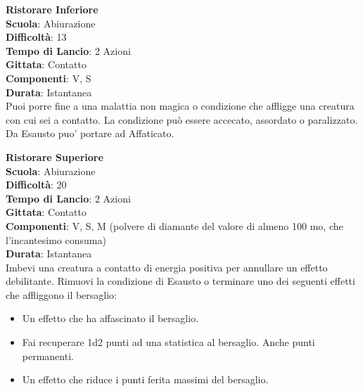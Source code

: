 \begin{multicols}{2}
\medskip\textbf{Ristorare Inferiore}\\
\textbf{Scuola}: Abiurazione\\
\textbf{Difficoltà}:  13\\
\textbf{Tempo di Lancio}: 2 Azioni\\
\textbf{Gittata}: Contatto\\
\textbf{Componenti}: V, S\\
\textbf{Durata}: Istantanea\\
Puoi porre fine a una malattia non magica o condizione che affligge una creatura con cui sei a contatto. La condizione può essere accecato, assordato o paralizzato. Da Esausto puo' portare ad Affaticato.

\medskip\textbf{Ristorare Superiore}\\
\textbf{Scuola}: Abiurazione\\
\textbf{Difficoltà}:  20\\
\textbf{Tempo di Lancio}: 2 Azioni\\
\textbf{Gittata}: Contatto\\
\textbf{Componenti}: V, S, M (polvere di diamante del valore di almeno 100 mo, che l'incantesimo consuma)\\
\textbf{Durata}: Istantanea\\
Imbevi una creatura a contatto di energia positiva per annullare un effetto debilitante. Rimuovi la condizione di Esausto o terminare uno dei seguenti effetti che affliggono il bersaglio: 
\medskip
\begin{itemize}
\item
Un effetto che ha affascinato il bersaglio.
\item
Fai recuperare 1d2 punti ad una statistica al bersaglio. Anche punti permanenti.
\item
Un effetto che riduce i punti ferita massimi del bersaglio.
\end{itemize}


\end{multicols}
